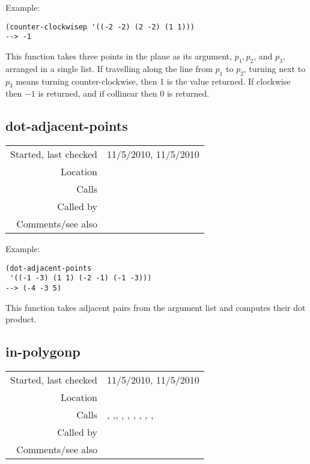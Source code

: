 \vspace{0.5cm}
\noindent Example:
\begin{verbatim}
(counter-clockwisep '((-2 -2) (2 -2) (1 1)))
--> -1
\end{verbatim}

\noindent This function takes three points in the
plane as its argument, $p_1, p_2$, and $p_3$, arranged
in a single list. If travelling along the line from
$p_1$ to $p_2$, turning next to $p_3$ means turning
counter-clockwise, then 1 is the value returned. If
clockwise then $-1$ is returned, and if collinear then
0 is returned.


\subsection*{dot-adjacent-points}\label{fun:dot-adjacent-points}

\vspace{0.3cm}
\begin{tabular}{r|p{8cm}}
Started, last checked & 11/5/2010, 11/5/2010 \\
Location & \nameref{sec:geometric-operations} \\
Calls & \\
Called by & \nameref{fun:in-polygonp} \\
Comments/see also & 
\end{tabular}

\vspace{0.5cm}
\noindent Example:
\begin{verbatim}
(dot-adjacent-points
 '((-1 -3) (1 1) (-2 -1) (-1 -3)))
--> (-4 -3 5)
\end{verbatim}

\noindent This function takes adjacent pairs from the
argument list and computes their dot product.


\subsection*{in-polygonp}\label{fun:in-polygonp}

\vspace{0.3cm}
\begin{tabular}{r|p{8cm}}
Started, last checked & 11/5/2010, 11/5/2010 \\
Location & \nameref{sec:geometric-operations} \\
Calls & \nameref{fun:dot-adjacent-points}, \nameref{fun:fibonacci-list},\newline \nameref{fun:multiply-list-by-constant}, \nameref{fun:multiply-two-lists}, \nameref{fun:my-last}, \nameref{fun:quadrant-number}, \newline \nameref{fun:signum-adjacent-determinants}, \newline \nameref{fun:spacing-items}, \newline \nameref{fun:substitute-index-by-index-abs-x}, \nameref{fun:translation} \\
Called by & \nameref{fun:points-in-convex-hull} \\
Comments/see also & 
\end{tabular}

